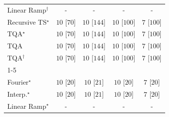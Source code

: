 \begin{tabular}{l|cccc|}
Linear Ramp$^\dagger$ & {\cellcolor[HTML]{000000}} \color[HTML]{F1F1F1} {\cellcolor{white}} \color{black} - & {\cellcolor[HTML]{000000}} \color[HTML]{F1F1F1} {\cellcolor{white}} \color{black} - & {\cellcolor[HTML]{000000}} \color[HTML]{F1F1F1} {\cellcolor{white}} \color{black} - & {\cellcolor[HTML]{000000}} \color[HTML]{F1F1F1} {\cellcolor{white}} \color{black} - \\
Recursive TS$^\star$ & {\cellcolor[HTML]{00441B}} \color[HTML]{F1F1F1} $10$ [$70$] & {\cellcolor[HTML]{00441B}} \color[HTML]{F1F1F1} $10$ [$144$] & {\cellcolor[HTML]{00441B}} \color[HTML]{F1F1F1} $10$ [$100$] & {\cellcolor[HTML]{37A055}} \color[HTML]{F1F1F1} $7$ [$100$] \\
TQA$^\star$ & {\cellcolor[HTML]{00441B}} \color[HTML]{F1F1F1} $10$ [$70$] & {\cellcolor[HTML]{00441B}} \color[HTML]{F1F1F1} $10$ [$144$] & {\cellcolor[HTML]{00441B}} \color[HTML]{F1F1F1} $10$ [$100$] & {\cellcolor[HTML]{37A055}} \color[HTML]{F1F1F1} $7$ [$100$] \\
TQA & {\cellcolor[HTML]{00441B}} \color[HTML]{F1F1F1} $10$ [$70$] & {\cellcolor[HTML]{00441B}} \color[HTML]{F1F1F1} $10$ [$144$] & {\cellcolor[HTML]{00441B}} \color[HTML]{F1F1F1} $10$ [$100$] & {\cellcolor[HTML]{37A055}} \color[HTML]{F1F1F1} $7$ [$100$] \\
TQA$^\dagger$ & {\cellcolor[HTML]{00441B}} \color[HTML]{F1F1F1} $10$ [$70$] & {\cellcolor[HTML]{00441B}} \color[HTML]{F1F1F1} $10$ [$144$] & {\cellcolor[HTML]{00441B}} \color[HTML]{F1F1F1} $10$ [$100$] & {\cellcolor[HTML]{37A055}} \color[HTML]{F1F1F1} $7$ [$100$] \\
\cline{1-5}
\multicolumn{5}{c}{\rule{0pt}{8pt}SV} \\
\midrule
Fourier$^\star$ & {\cellcolor[HTML]{00441B}} \color[HTML]{F1F1F1} $10$ [$20$] & {\cellcolor[HTML]{00441B}} \color[HTML]{F1F1F1} $10$ [$21$] & {\cellcolor[HTML]{00441B}} \color[HTML]{F1F1F1} $10$ [$20$] & {\cellcolor[HTML]{37A055}} \color[HTML]{F1F1F1} $7$ [$20$] \\
Interp.$^\star$ & {\cellcolor[HTML]{00441B}} \color[HTML]{F1F1F1} $10$ [$20$] & {\cellcolor[HTML]{00441B}} \color[HTML]{F1F1F1} $10$ [$21$] & {\cellcolor[HTML]{00441B}} \color[HTML]{F1F1F1} $10$ [$20$] & {\cellcolor[HTML]{37A055}} \color[HTML]{F1F1F1} $7$ [$20$] \\
Linear Ramp$^\star$ & {\cellcolor[HTML]{000000}} \color[HTML]{F1F1F1} {\cellcolor{white}} \color{black} - & {\cellcolor[HTML]{000000}} \color[HTML]{F1F1F1} {\cellcolor{white}} \color{black} - & {\cellcolor[HTML]{000000}} \color[HTML]{F1F1F1} {\cellcolor{white}} \color{black} - & {\cellcolor[HTML]{000000}} \color[HTML]{F1F1F1} {\cellcolor{white}} \color{black} - \\

\end{tabular}
